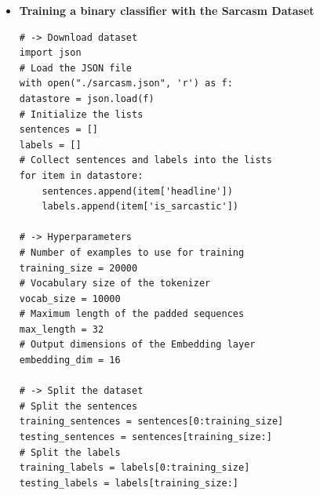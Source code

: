 \documentclass[20pt]{article}
\begin{document}
\begin{itemize}
\begin{verbatim}
# -> Train the Model
num_epochs = 10
# Train the model
model.fit(padded, training_labels_final, epochs=num_epochs, validation_data=(testing_padded, testing_labels_final))

# -> Visualize Word Embeddings
# Get the embedding layer from the model (i.e. first layer)
embedding_layer = model.layers[0]
# Get the weights of the embedding layer
embedding_weights = embedding_layer.get_weights()[0]
# Print the shape. Expected is (vocab_size, embedding_dim)
print(embedding_weights.shape) 
# Get the index-word dictionary
reverse_word_index = tokenizer.index_word
# loop to generate the files. You will loop vocab_size-1 times, skipping the 0 key because it is just for the padding
import io
# Open writeable files
out_v = io.open('vecs.tsv', 'w', encoding='utf-8')
out_m = io.open('meta.tsv', 'w', encoding='utf-8')
# Initialize the loop. Start counting at `1` because `0` is just for the padding
for word_num in range(1, vocab_size):
	# Get the word associated at the current index
	word_name = reverse_word_index[word_num]
	# Get the embedding weights associated with the current index
	word_embedding = embedding_weights[word_num]
	# Write the word name
	out_m.write(word_name + "\n")
	# Write the word embedding
	out_v.write('\t'.join([str(x) for x in word_embedding]) + "\n")
# Close the files
out_v.close()
out_m.close()
# Now you can go to the Tensorflow Embedding Projector and load the two files
# you downloaded to see the visualization. You can search for words like worst and
# fantastic and see the other words closely located to these.
		\end{verbatim}
		\item \textbf{Training a binary classifier with the Sarcasm Dataset}
		\begin{verbatim}
# -> Download dataset
import json
# Load the JSON file
with open("./sarcasm.json", 'r') as f:
datastore = json.load(f)
# Initialize the lists
sentences = []
labels = []
# Collect sentences and labels into the lists
for item in datastore:
	sentences.append(item['headline'])
	labels.append(item['is_sarcastic'])

# -> Hyperparameters
# Number of examples to use for training
training_size = 20000
# Vocabulary size of the tokenizer
vocab_size = 10000
# Maximum length of the padded sequences
max_length = 32
# Output dimensions of the Embedding layer
embedding_dim = 16

# -> Split the dataset
# Split the sentences
training_sentences = sentences[0:training_size]
testing_sentences = sentences[training_size:]
# Split the labels
training_labels = labels[0:training_size]
testing_labels = labels[training_size:]


\end{verbatim}
\end{itemize}
\end{document}

